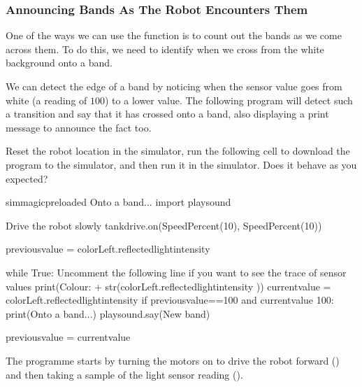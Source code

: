 \documentclass[letterpaper,10pt,english]{sphinxmanual}
\begin{document}
\subsubsection{Announcing Bands As The Robot Encounters Them}
\label{\detokenize{content/00_SOFTWARE_GUIDE/Section_00_03_quick_practical_tour:Announcing-Bands-As-The-Robot-Encounters-Them}}
One of the ways we can use the  function is to count out the bands as we come across them. To do this, we need to identify when we cross from the white background onto a band.

We can detect the edge of a band by noticing when the sensor value goes from white (a reading of \(100\)) to a lower value. The following program will detect such a transition and say that it has crossed onto a band, also displaying a print message to announce the fact too.

Reset the robot location in the simulator, run the following cell to download the program to the simulator, and then run it in the simulator. Does it behave as you expected?

{
\begin{sphinxVerbatim}[commandchars=\\\{\}]
\llap{\color{nbsphinxin}[ ]:\,\hspace{\fboxrule}\hspace{\fboxsep}}\PYGZpc{}\PYGZpc{}sim\PYGZus{}magic\PYGZus{}preloaded
\PYGZsh{} Onto a band...
import playsound

\PYGZsh{} Drive the robot slowly
tank\PYGZus{}drive.on(SpeedPercent(10), SpeedPercent(10))

previous\PYGZus{}value = colorLeft.reflected\PYGZus{}light\PYGZus{}intensity

while True:
    \PYGZsh{}Uncomment the following line if you want to see the trace of sensor values
    \PYGZsh{}print(\PYGZsq{}Colour: \PYGZsq{} + str(colorLeft.reflected\PYGZus{}light\PYGZus{}intensity ))
    current\PYGZus{}value = colorLeft.reflected\PYGZus{}light\PYGZus{}intensity
    if previous\PYGZus{}value==100 and current\PYGZus{}value \PYGZlt{} 100:
        print(\PYGZsq{}Onto a band...\PYGZsq{})
        playsound.say(\PYGZdq{}New band\PYGZdq{})

    previous\PYGZus{}value = current\PYGZus{}value
\end{sphinxVerbatim}
}

The programme starts by turning the motors on to drive the robot forward () and then taking a sample of the light sensor reading ().
\end{document}
